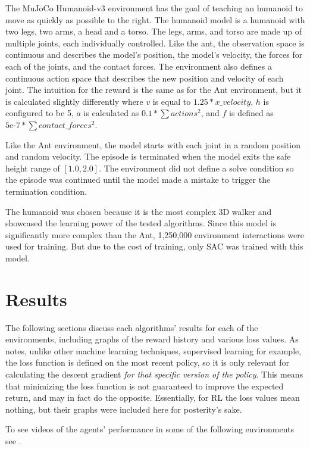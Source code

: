 \documentclass[conference]{IEEEtran}
\begin{document}
The MuJoCo Humanoid-v3 environment has the goal of teaching an humanoid to move as quickly as possible to the right. The humanoid model is a humanoid with two legs, two arms, a head and a torso. The legs, arms, and torso are made up of multiple joints, each individually controlled. Like the ant, the observation space is continuous and describes the model's position, the model's velocity, the forces for each of the joints, and the contact forces. The environment also defines a continuous action space that describes the new position and velocity of each joint. The intuition for the reward is the same as for the Ant environment, but it is calculated slightly differently where $v$ is equal to $1.25 * x\_velocity$, $h$ is configured to be 5, $a$ is calculated as $0.1 * \sum actions^{2}$, and $f$ is defined as $5\text{e-}7 * \sum contact\_forces^{2}$.

Like the Ant environment, the model starts with each joint in a random position and random velocity. The episode is terminated when the model exits the safe height range of $[1.0, 2.0]$. The environment did not define a solve condition so the episode was continued until the model made a mistake to trigger the termination condition.

The humanoid was chosen because it is the most complex 3D walker and showcased the learning power of the tested algorithms. Since this model is significantly more complex than the Ant, 1,250,000 environment interactions were used for training. But due to the cost of training, only SAC was trained with this model.

\section{Results}

The following sections discuss each algorithms' results for each of the environments, including graphs of the reward history and various loss values. As \cite{spinning_up_intro} notes, unlike other machine learning techniques, supervised learning for example, the loss function is defined on the most recent policy, so it is only relevant for calculating the descent gradient \textit{for that specific version of the policy}. This means that minimizing the loss function is not guaranteed to improve the expected return, and may in fact do the opposite. Essentially, for RL the loss values mean nothing, but their graphs were included here for posterity's sake.

To see videos of the agents' performance in some of the following environments see \cite{agent_videos}.
\end{document}
